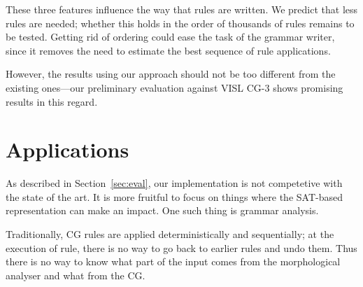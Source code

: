 \documentclass[11pt]{article}
\newcommand{\todo}[1]{{\color{cyan}\textbf{[TODO: }#1\textbf{]}}}
\begin{document}



\noindent These three features influence the way that rules are written. 
We predict that less rules are needed; whether this holds in
the order of thousands of rules remains to be tested.
Getting rid of ordering could ease the task of the grammar writer,
since it removes the need to estimate the best sequence of rule
applications.

However, the results using our approach should not be too different from the
existing ones---our preliminary evaluation against VISL CG-3 shows
promising results in this regard.

\section{Applications}

As described in Section~\ref{sec:eval}, our implementation is not
competetive with the state of the art. It is more fruitful to focus on
things where the SAT-based representation can make an impact.
One such thing is grammar analysis.

Traditionally, CG rules are applied deterministically and
sequentially; at the execution of rule, there is no way to
go back to earlier rules and undo them. Thus there is no way to know
what part of the input comes from the morphological analyser and what
from the CG.
\end{document}
